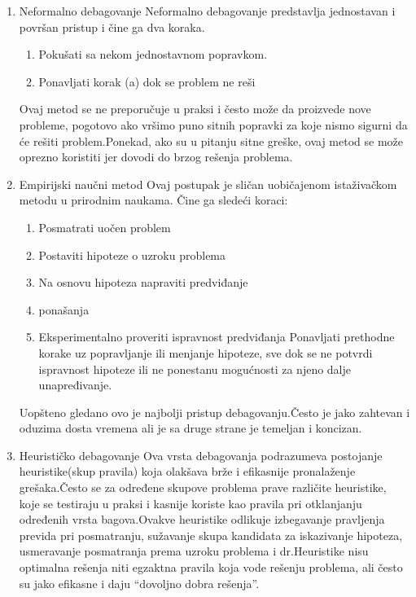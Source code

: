 \documentclass[a4paper]{article}
\begin{document}
\begin{enumerate}
	\item Neformalno debagovanje
	Neformalno debagovanje predstavlja jednostavan i površan pristup i čine ga dva koraka.
	\begin{enumerate}
		\item Pokušati sa nekom jednostavnom popravkom.
		\item Ponavljati korak (a) dok se problem ne reši
	\end{enumerate}
	Ovaj metod se ne preporučuje u praksi i često može da proizvede nove probleme, pogotovo ako vršimo puno sitnih popravki za koje nismo sigurni da će rešiti problem.Ponekad, ako su u pitanju sitne greške, ovaj metod se može oprezno koristiti jer dovodi do brzog rešenja problema.\cite{bagovi_smalkov}
	
	\item Empirijski naučni metod
	Ovaj postupak je sličan uobičajenom istaživačkom metodu u prirodnim naukama.
	Čine ga sledeći koraci:
	\begin{enumerate}
		\item Posmatrati uočen problem
		\item Postaviti hipoteze o uzroku problema
		\item Na osnovu hipoteza napraviti predviđanje \item ponašanja
		\item Eksperimentalno proveriti ispravnost predviđanja
		Ponavljati prethodne korake uz popravljanje ili menjanje hipoteze, sve dok se ne potvrdi ispravnost hipoteze ili ne ponestanu mogućnosti za njeno dalje unapređivanje.
	\end{enumerate}
	\indent Uopšteno gledano ovo je najbolji pristup debagovanju.Često je jako zahtevan i oduzima dosta vremena ali je sa druge strane je temeljan i koncizan.\cite{bagovi_smalkov}
	
	
	\item Heurističko debagovanje
	Ova vrsta debagovanja podrazumeva postojanje heuristike(skup pravila) koja olakšava brže i efikasnije pronalaženje grešaka.Često se za određene skupove problema prave različite heuristike, koje se testiraju u praksi i kasnije koriste kao pravila pri otklanjanju određenih vrsta bagova.Ovakve heuristike odlikuje izbegavanje pravljenja previda pri posmatranju, sužavanje skupa kandidata za iskazivanje hipoteza, usmeravanje posmatranja prema uzroku problema i dr.Heuristike nisu optimalna rešenja niti egzaktna pravila koja vode rešenju problema, ali često su jako efikasne i daju “dovoljno dobra rešenja”.\cite{bagovi_smalkov}
\end{enumerate}
\end{document}
